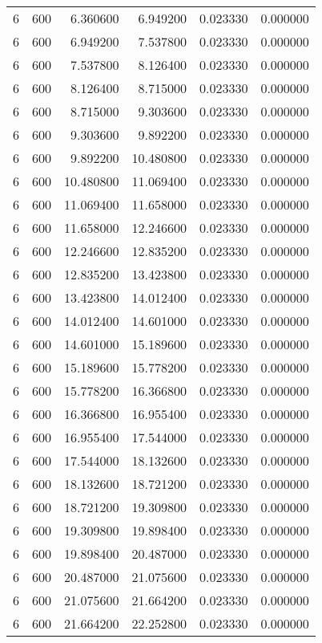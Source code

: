 \begin{longtable}{rrrrrr}
6 & 600 & 6.360600 & 6.949200 & 0.023330 & 0.000000 \\
6 & 600 & 6.949200 & 7.537800 & 0.023330 & 0.000000 \\
6 & 600 & 7.537800 & 8.126400 & 0.023330 & 0.000000 \\
6 & 600 & 8.126400 & 8.715000 & 0.023330 & 0.000000 \\
6 & 600 & 8.715000 & 9.303600 & 0.023330 & 0.000000 \\
6 & 600 & 9.303600 & 9.892200 & 0.023330 & 0.000000 \\
6 & 600 & 9.892200 & 10.480800 & 0.023330 & 0.000000 \\
6 & 600 & 10.480800 & 11.069400 & 0.023330 & 0.000000 \\
6 & 600 & 11.069400 & 11.658000 & 0.023330 & 0.000000 \\
6 & 600 & 11.658000 & 12.246600 & 0.023330 & 0.000000 \\
6 & 600 & 12.246600 & 12.835200 & 0.023330 & 0.000000 \\
6 & 600 & 12.835200 & 13.423800 & 0.023330 & 0.000000 \\
6 & 600 & 13.423800 & 14.012400 & 0.023330 & 0.000000 \\
6 & 600 & 14.012400 & 14.601000 & 0.023330 & 0.000000 \\
6 & 600 & 14.601000 & 15.189600 & 0.023330 & 0.000000 \\
6 & 600 & 15.189600 & 15.778200 & 0.023330 & 0.000000 \\
6 & 600 & 15.778200 & 16.366800 & 0.023330 & 0.000000 \\
6 & 600 & 16.366800 & 16.955400 & 0.023330 & 0.000000 \\
6 & 600 & 16.955400 & 17.544000 & 0.023330 & 0.000000 \\
6 & 600 & 17.544000 & 18.132600 & 0.023330 & 0.000000 \\
6 & 600 & 18.132600 & 18.721200 & 0.023330 & 0.000000 \\
6 & 600 & 18.721200 & 19.309800 & 0.023330 & 0.000000 \\
6 & 600 & 19.309800 & 19.898400 & 0.023330 & 0.000000 \\
6 & 600 & 19.898400 & 20.487000 & 0.023330 & 0.000000 \\
6 & 600 & 20.487000 & 21.075600 & 0.023330 & 0.000000 \\
6 & 600 & 21.075600 & 21.664200 & 0.023330 & 0.000000 \\
6 & 600 & 21.664200 & 22.252800 & 0.023330 & 0.000000 \\

\end{longtable}
